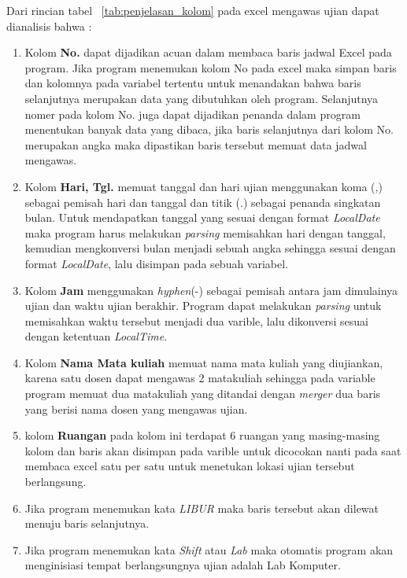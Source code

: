 Dari rincian tabel ~\ref{tab:penjelasan_kolom} pada excel mengawas ujian dapat dianalisis bahwa : 
\begin{enumerate}
	\item Kolom \textbf{No.} dapat dijadikan acuan dalam membaca baris jadwal Excel pada program. Jika program menemukan kolom No pada excel maka simpan baris dan kolomnya pada variabel tertentu untuk menandakan bahwa baris selanjutnya merupakan data yang dibutuhkan oleh program. Selanjutnya nomer pada kolom No. juga dapat dijadikan penanda dalam program menentukan banyak data yang dibaca, jika baris selanjutnya dari kolom No. merupakan angka maka dipastikan baris tersebut memuat data jadwal mengawas.
		\item Kolom \textbf{Hari, Tgl.} memuat tanggal dan hari ujian menggunakan koma (,) sebagai pemisah hari dan tanggal dan titik (.) sebagai penanda singkatan bulan. Untuk mendapatkan tanggal yang sesuai dengan format \textit{LocalDate} maka program harus melakukan \textit{parsing} memisahkan hari dengan tanggal, kemudian mengkonversi bulan menjadi sebuah angka sehingga sesuai dengan format \textit{LocalDate}, lalu disimpan pada sebuah variabel.
		\item Kolom \textbf{Jam} menggunakan \textit{hyphen}(-) sebagai pemisah antara jam dimulainya ujian dan waktu ujian berakhir. Program dapat melakukan \textit{parsing} untuk memisahkan waktu tersebut menjadi dua varible, lalu dikonversi sesuai dengan ketentuan \textit{LocalTime}.
		\item Kolom \textbf{Nama Mata kuliah} memuat nama mata kuliah yang diujiankan, karena satu dosen dapat mengawas 2 matakuliah sehingga pada variable program memuat dua matakuliah yang ditandai dengan \textit{merger} dua baris yang berisi nama dosen  yang mengawas ujian.
		\item kolom \textbf{Ruangan} pada kolom ini terdapat 6 ruangan yang masing-masing kolom dan baris akan disimpan pada varible untuk dicocokan nanti pada saat membaca excel satu per satu untuk menetukan lokasi ujian tersebut berlangsung.
		\item Jika program menemukan kata \textit{LIBUR} maka baris tersebut akan dilewat menuju baris selanjutnya.
		\item Jika program menemukan kata \textit{Shift} atau \textit{Lab} maka otomatis program akan menginisiasi tempat berlangsungnya ujian adalah Lab Komputer.
\end{enumerate}

